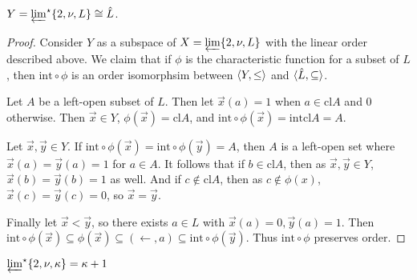 \documentclass[11pt]{article}
\renewcommand{\int}{\textrm{int}}
\renewcommand{\cl}{\textrm{cl}}
\newcommand{\lexTimes}{\times_{\textrm{lex}}}
\begin{document}
  \begin{theorem}
    \(Y=\varprojlim^\star \{2, \nu, L\}\cong \hat L\).
  \end{theorem}

  \begin{proof}
    Consider \(Y\) as a subspace of \(X=\varprojlim \{2, \nu, L\}\) with
    the linear order described above. We claim that if \(\phi\) is the
    characteristic function for a subset of \(L\), then \(\int\circ\phi\)
    is an order isomorphsim between \(\langle Y,\leq\rangle\) and
    \(\langle\hat L,\subseteq\rangle\).

    Let \(A\) be a left-open subset of \(L\). Then let \(\vec x(a)=1\) when
    \(a\in\cl A\) and \(0\) otherwise. Then \(\vec x\in Y\),
    \(\phi(\vec x)=\cl A\), and \(\int\circ\phi(\vec x)=\int\cl A=A\).

    Let \(\vec x,\vec y\in Y\). If
    \(\int\circ\phi(\vec x)=\int\circ\phi(\vec y)=A\), then \(A\) is a
    left-open set where \(\vec x(a)=\vec y(a)=1\) for \(a\in A\). It follows
    that if \(b\in\cl A\), then as \(\vec x,\vec y\in Y\),
    \(\vec x(b)=\vec y(b)=1\) as well. And if \(c\not\in\cl A\), then
    as \(c\not\in\phi(x)\),
    \(\vec x(c)=\vec y(c)=0\), so \(\vec x=\vec y\).

    Finally let \(\vec x<\vec y\), so there exists \(a\in L\) with
    \(\vec x(a)=0,\vec y(a)=1\). Then
    \(
      \int\circ\phi(\vec x)
        \subseteq
      \phi(\vec x)
        \subseteq
      (\leftarrow,a)
        \subseteq
      \int\circ\phi(\vec y)
    \). Thus \(\int\circ\phi\) preserves order.
  \end{proof}

  \begin{corollary}
    \(\varprojlim^\star \{2, \nu, \kappa\}=\kappa+1\)
  \end{corollary}



\newpage


\end{document}
